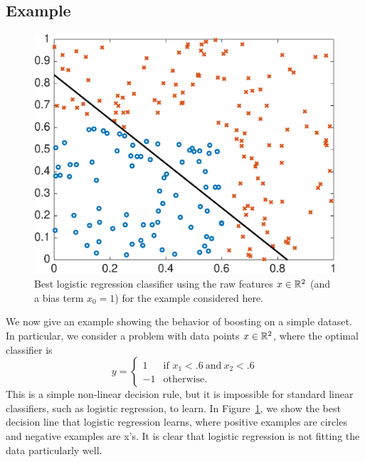 \documentclass{article}
\begin{document}
\subsection{Example}

\begin{figure}[ht]
  \begin{center}
    \includegraphics[width=.6\columnwidth]{logistic_plot.eps}
    \caption{\label{fig:logreg} Best logistic regression classifier
      using the raw features $x \in \mathbb{R}^2$ (and a bias term $x_0 = 1$)
      for the example considered here.}
  \end{center}
\end{figure}


We now give an example showing the behavior of boosting on a simple dataset.
In particular, we consider a problem with data points $x \in \mathbb{R}^2$, where
the optimal classifier is
\begin{equation}
  \label{eqn:simple-nonlinear}
  y = \begin{cases} 1 & \mbox{if~} x_1 < .6 ~\mbox{and}~ x_2 < .6 \\
    -1 & \mbox{otherwise}.
  \end{cases}
\end{equation}
This is a simple non-linear decision rule, but it is impossible for standard
linear classifiers, such as logistic regression, to learn.  In
Figure~\ref{fig:logreg}, we show the best decision line that logistic
regression learns, where positive examples are circles and negative examples
are x's. It is clear that logistic regression is not fitting the data
particularly well.
\end{document}
